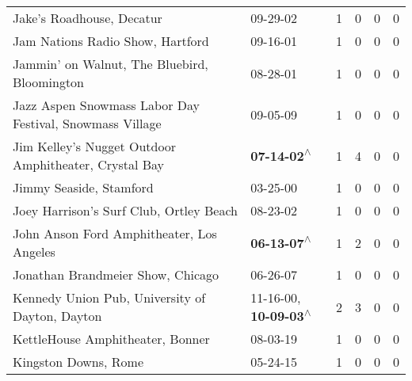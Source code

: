 \begin{supertabular}{p{0.4\textwidth}p{0.3\textwidth}p{0.05\textwidth}p{0.05\textwidth}p{0.05\textwidth}p{0.05\textwidth}}
                                                    Jake's Roadhouse, Decatur &                                                                  09-29-02\textsuperscript{} &  1 &  0 &  0 &  0 \\
                                             Jam Nations Radio Show, Hartford &                                                                  09-16-01\textsuperscript{} &  1 &  0 &  0 &  0 \\
                                 Jammin' on Walnut, The Bluebird, Bloomington &                                                                  08-28-01\textsuperscript{} &  1 &  0 &  0 &  0 \\
                     Jazz Aspen Snowmass Labor Day Festival, Snowmass Village &                                                                  09-05-09\textsuperscript{} &  1 &  0 &  0 &  0 \\
                        Jim Kelley's Nugget Outdoor Amphitheater, Crystal Bay &                                                 \textbf{07-14-02\textsuperscript{$\wedge$}} &  1 &  4 &  0 &  0 \\
                                                      Jimmy Seaside, Stamford &                                                                  03-25-00\textsuperscript{} &  1 &  0 &  0 &  0 \\
                                      Joey Harrison's Surf Club, Ortley Beach &                                                                  08-23-02\textsuperscript{} &  1 &  0 &  0 &  0 \\
                                    John Anson Ford Amphitheater, Los Angeles &                                                 \textbf{06-13-07\textsuperscript{$\wedge$}} &  1 &  2 &  0 &  0 \\
                                            Jonathan Brandmeier Show, Chicago &                                                                  06-26-07\textsuperscript{} &  1 &  0 &  0 &  0 \\
                              Kennedy Union Pub, University of Dayton, Dayton &                     11-16-00\textsuperscript{}, \textbf{10-09-03\textsuperscript{$\wedge$}} &  2 &  3 &  0 &  0 \\
                                             KettleHouse Amphitheater, Bonner &                                                                  08-03-19\textsuperscript{} &  1 &  0 &  0 &  0 \\
                                                         Kingston Downs, Rome &                                                                  05-24-15\textsuperscript{} &  1 &  0 &  0 &  0 \\

\end{supertabular}
